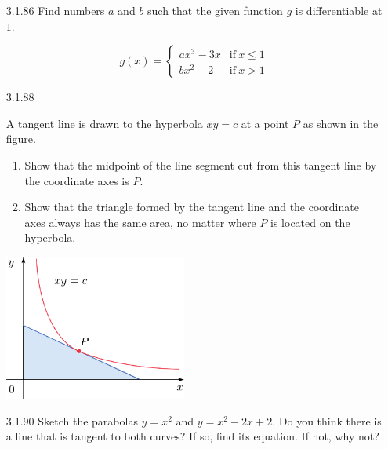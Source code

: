 \documentclass{article}
\begin{document}
\begin{enumerate}

    \item[3.1.86]
        Find numbers $a$ and $b$ such that the given function $g$ is differentiable at $1$.

        \begin{equation*}
            g(x) =
            \begin{cases}
                ax^3 - 3x & \text{if} \ x \leq 1\\
                bx^2 + 2 & \text{if} \ x > 1
            \end{cases}
        \end{equation*}

    \vspace{6cm}

    \item[3.1.88]

        A tangent line is drawn to the hyperbola $xy = c$ at a point $P$ as shown in the figure.
        \begin{enumerate}
            \item Show that the midpoint of the line segment cut from this tangent line by the coordinate axes is $P$.
            \item Show that the triangle formed by the tangent line and the coordinate axes always has the same area,
                no matter where $P$ is located on the hyperbola.
        \end{enumerate}

        \begin{center}
            \includegraphics[width=6cm]{./png/3.1.88.png}
        \end{center}

    \newpage


    \item[3.1.90]
        Sketch the parabolas $y = x^2$ and $y = x^2 - 2x + 2$.
        Do you think there is a line that is tangent to both curves?
        If so, find its equation. If not, why not?


\end{enumerate}
\end{document}
